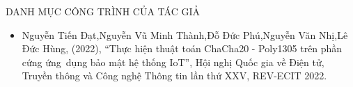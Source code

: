 \begin{frame}{DANH MỤC CÔNG TRÌNH CỦA TÁC GIẢ}
	\begin{itemize}
		\item Nguyễn Tiến Đạt,Nguyễn Vũ Minh Thành,Đỗ Đức Phú,Nguyễn Văn Nhị,Lê Đức Hùng, (2022), ``Thực hiện thuật toán ChaCha20 - Poly1305 trên phần cứng ứng~dụng bảo mật hệ thống IoT'', Hội nghị Quốc gia về Điện tử, Truyền thông và Công nghệ Thông tin lần thứ XXV, REV-ECIT 2022.
	\end{itemize}
\end{frame}